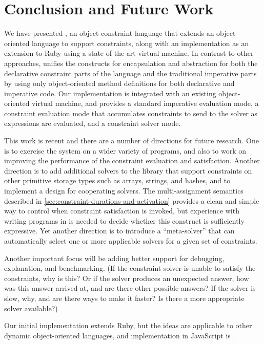\section{Conclusion and Future Work}
\label{sec:conclusion}
We have presented \langname, an object constraint language that extends
an object-oriented language to support constraints, along with
an implementation as an extension to Ruby using a state of the art
virtual machine.  In contrast to other approaches, \langname unifies
the constructs for encapsulation and abstraction for both the
declarative constraint parts of the language and the traditional
imperative parts by using only object-oriented method definitions for
both declarative and imperative code.  Our implementation is
integrated with an existing object-oriented virtual machine, and
provides a standard imperative evaluation mode, a constraint
evaluation mode that accumulates constraints to send to the solver
as expressions are evaluated, and a constraint solver mode.

This work is recent and there are a number of directions for future
research.  One is to exercise the system on a wider variety of
programs, and also to work on improving the performance of the
constraint evaluation and satisfaction.  Another direction is to add
additional solvers to the library that support constraints on other
primitive storage types such as arrays, strings, and hashes, and to
implement a design for cooperating solvers.  The multi-assignment
semantics described in
\autoref{sec:constraint-durations-and-activation} provides a clean and
simple way to control when constraint satisfaction is invoked, but
experience with writing programs in \toolname is needed to decide
whether this construct is sufficiently expressive.  Yet another
direction is to introduce a ``meta-solver'' that can automatically
select one or more applicable solvers for a given set of constraints.

Another important focus will be adding better support for debugging,
explanation, and benchmarking.  (If the constraint solver is unable to
satisfy the constraints, why is this?  Or if the solver produces an
unexpected answer, how was this answer arrived at, and are there other
possible answers?  If the solver is slow, why, and are there ways to
make it faster?  Is there a more appropriate solver available?)

Our initial implementation extends Ruby, but the ideas are applicable
to other dynamic object-oriented languages, and \DIFdelbegin {}\DIFdelend \DIFaddbegin {}\DIFaddend implementation in
JavaScript is \DIFdelbegin {}\DIFdelend \DIFaddbegin {}\DIFaddend .

